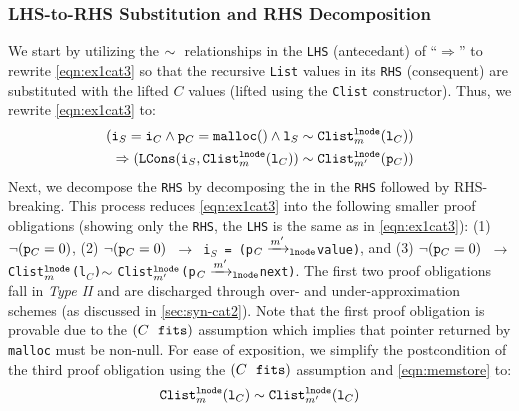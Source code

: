 \subsubsection{LHS-to-RHS Substitution and RHS Decomposition}
We start by utilizing
the $\sim{}$ relationships in the {\tt LHS} (antecedant) of ``$\Rightarrow$''
to rewrite \cref{eqn:ex1cat3}
so that the recursive {\tt List} values in its {\tt RHS} (consequent)
are substituted with the lifted $C$ values (lifted using
the {\tt Clist} constructor). Thus, we
rewrite \cref{eqn:ex1cat3} to:
\begin{equation}
\label{eqn:ex2cat3}
\begin{split}
({\tt i}_S={\tt i}_C \land {\tt p}_C={\tt malloc()} \land {\tt l}_S \sim{} {\tt Clist}_m^{{\tt lnode}}({\tt l}_C)) \\ \Rightarrow ({\tt LCons}({\tt i}_S, {\tt Clist}_m^{{\tt lnode}}({\tt l}_C)) \sim{} {\tt Clist}_{m'}^{{\tt lnode}}({\tt p}_C))
\end{split}
\end{equation}
Next, we decompose the {\tt RHS} by decomposing the \recursiveRelation{} in the {\tt RHS}
followed by RHS-breaking. This process reduces \cref{eqn:ex1cat3} into the following
smaller proof obligations (showing only the
{\tt RHS}, the {\tt LHS} is the same as in \cref{eqn:ex1cat3}):
(1) $\neg({\tt p}_C=0)$,
(2) {\tt $\neg({\tt p}_C=0)$ $\rightarrow$ i$_S$\ =\ (p$_C\xrightarrow[]{m'}_{\mathrm{\tt lnode}}$value)}, and
(3) {\tt $\neg({\tt p}_C=0)$ $\rightarrow$ Clist$_{m}^{{\tt lnode}}$(l$_C$)$\sim{}$Clist$_{m'}^{{\tt lnode}}$(p$_C\xrightarrow[]{m'}_{\mathrm{\tt lnode}}$next)}.
The first two proof obligations fall in {\em Type II} and
are discharged through over- and under-approximation schemes (as discussed
in \cref{sec:syn-cat2}). Note that the first proof obligation is provable due
to the $(C\ \  \mathrm{\tt fits})$ assumption which implies
that pointer returned by {\tt malloc} must be non-null.
For ease of exposition, we simplify the postcondition of the third proof obligation
using the $(C\ \  \mathrm{\tt fits})$ assumption and \cref{eqn:memstore} to:
\begin{equation}\label{eqn:clistPreserved}
{\tt Clist}_m^{\tt lnode}({\tt l}_C) \sim{} {\tt Clist}_{m'}^{\tt lnode}({{\tt l}_C})
\end{equation}

